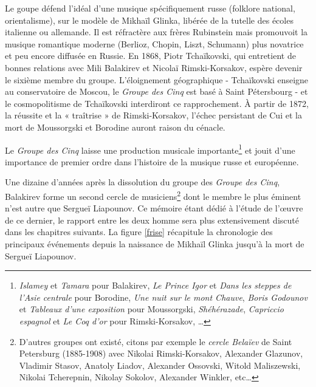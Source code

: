 Le goupe défend l'idéal d'une musique spécifiquement russe (folklore national, orientalisme), sur le modèle de Mikhaïl Glinka, libérée de la tutelle des écoles italienne ou allemande. Il est réfractère aux frères Rubinstein mais promouvoit la musique romantique moderne (Berlioz, Chopin, Liszt, Schumann) plus novatrice et peu encore diffusée en Russie. En 1868, Piotr Tchaïkovski, qui entretient de bonnes relations avec Mili Balakirev et Nicolaï Rimski-Korsakov, espère devenir le sixième membre du groupe. L'éloignement géographique - Tchaïkovski enseigne au conservatoire de Moscou, le \emph{Groupe des Cinq} est basé à Saint Pétersbourg - et le cosmopolitisme de Tchaïkovski interdiront ce rapprochement. À partir de 1872, la réussite et la « traîtrise » de Rimski-Korsakov, l'échec persistant de Cui et la mort de Moussorgski et Borodine auront raison du cénacle.

Le \emph{Groupe des Cinq} laisse une production musicale importante\footnote{\emph{Islamey} et \emph{Tamara} pour Balakirev, \emph{Le Prince Igor} et \emph{Dans les steppes de l'Asie centrale} pour Borodine, \emph{Une nuit sur le mont Chauve}, \emph{Boris Godounov} et \emph{Tableaux d'une exposition} pour Moussorgski, \emph{Shéhérazade}, \emph{Capriccio espagnol} et \emph{Le Coq d'or} pour Rimski-Korsakov, \dots} et jouit d'une importance de premier ordre dans l'histoire de la musique russe et européenne.

Une dizaine d'années après la dissolution du groupe des \emph{Groupe des Cinq}, Balakirev forme un second cercle de musiciens\footnote{D'autres groupes ont existé, citons par exemple le \emph{cercle Belaïev} de Saint Petersburg (1885-1908) avec Nikolai Rimski-Korsakov, Alexander Glazunov, Vladimir Stasov, Anatoly Liadov, Alexander Ossovski, Witold Maliszewski, Nikolai Tcherepnin, Nikolay Sokolov, Alexander Winkler, etc\dots} dont le membre le plus éminent n'est autre que Sergueï Liapounov. Ce mémoire étant dédié à l'étude de l'œuvre de ce dernier, le rapport entre les deux homme sera plus extensivement discuté dans les chapitres suivants. La figure \ref{frise} récapitule la chronologie des principaux événements depuis la naissance de Mikhaïl Glinka jusqu'à la mort de Sergueï Liapounov.

